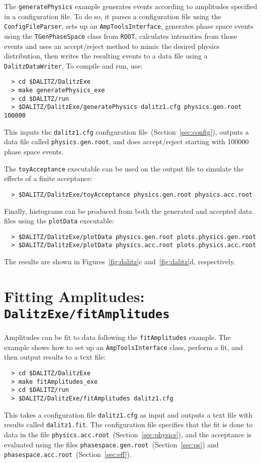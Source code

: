 \documentclass[10pt]{article}
\begin{document}
The {\tt generatePhysics} example generates events according to amplitudes specified in a configuration file.  To do so, it parses a configuration file using the {\tt ConfigFileParser}, sets up an {\tt AmpToolsInterface}, generates phase space events using the {\tt TGenPhaseSpace} class from {\tt ROOT}, calculates intensities from those events and uses an accept/reject method to mimic the desired physics distribution, then writes the resulting events to a data file using a {\tt DalitzDataWriter}.  To compile and run, use:
\begin{verbatim}
  > cd $DALITZ/DalitzExe
  > make generatePhysics_exe
  > cd $DALITZ/run
  > $DALITZ/DalitzExe/generatePhysics dalitz1.cfg physics.gen.root 100000
\end{verbatim}
This inputs the {\tt dalitz1.cfg} configuration file~(Section~\ref{sec:config}), outputs a data file called {\tt physics.gen.root}, and does accept/reject starting with 100000 phase space events.

The {\tt toyAcceptance} executable can be used on the output file to simulate the effects of a finite acceptance:
\begin{verbatim}
  > $DALITZ/DalitzExe/toyAcceptance physics.gen.root physics.acc.root
\end{verbatim}
Finally, histograms can be produced from both the generated and accepted data files using the {\tt plotData} executable:
\begin{verbatim}
  > $DALITZ/DalitzExe/plotData physics.gen.root plots.physics.gen.root
  > $DALITZ/DalitzExe/plotData physics.acc.root plots.physics.acc.root
\end{verbatim}
The results are shown in Figures~\ref{fig:dalitz}c and~\ref{fig:dalitz}d, respectively.

\section{Fitting Amplitudes: \\
{\tt DalitzExe/fitAmplitudes}}
\label{sec:fit}

Amplitudes can be fit to data following the {\tt fitAmplitudes} example.  The example shows how to set up an {\tt AmpToolsInterface} class, perform a fit, and then output results to a text file:
\begin{verbatim}
  > cd $DALITZ/DalitzExe
  > make fitAmplitudes_exe
  > cd $DALITZ/run
  > $DALITZ/DalitzExe/fitAmplitudes dalitz1.cfg
\end{verbatim}
This takes a configuration file {\tt dalitz1.cfg} as input and outputs a text file with results called {\tt dalitz1.fit}.  The configuration file specifies that the fit is done to data in the file {\tt physics.acc.root}~(Section~\ref{sec:physics}), and the acceptance is evaluated using the files {\tt phasespace.gen.root}~(Section~\ref{sec:ps}) and {\tt phasespace.acc.root}~(Section~\ref{sec:eff}).
\end{document}
